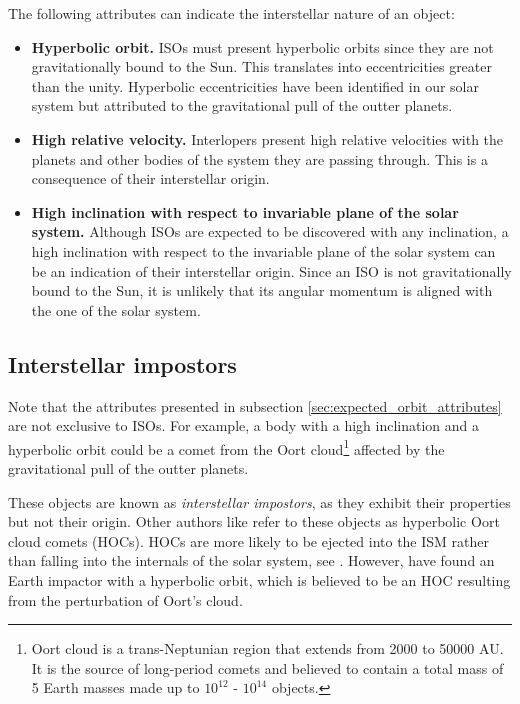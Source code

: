 The following attributes can indicate the interstellar nature of an object:

\begin{itemize}
  \item \textbf{Hyperbolic orbit.} ISOs must present hyperbolic orbits since
        they are not gravitationally bound to the Sun. This translates into
        eccentricities greater than the unity. Hyperbolic eccentricities have
        been identified in our solar system but attributed to the gravitational
        pull of the outter planets.
  \item \textbf{High relative velocity.} Interlopers present high relative
        velocities with the planets and other bodies of the system they are
        passing through. This is a consequence of their interstellar origin.
  \item \textbf{High inclination with respect to invariable plane of the solar
          system.} Although ISOs are expected to be discovered with any
        inclination, a high inclination with respect to the invariable plane of
        the solar system can be an indication of their interstellar origin.
        Since an ISO is not gravitationally bound to the Sun, it is unlikely
        that its angular momentum is aligned with the one of the solar system.
\end{itemize}

\subsection{Interstellar impostors}

Note that the attributes presented in subsection
\ref{sec:expected_orbit_attributes} are not exclusive to ISOs. For example, a
body with a high inclination and a hyperbolic orbit could be a comet from the
Oort cloud\footnote{ Oort cloud is a trans-Neptunian region that extends from
  2000 to 50000 AU. It is the source of long-period comets and believed to contain
  a total mass of 5 Earth masses made up to $10^{12}$ - $10^{14}$ objects. }
affected by the gravitational pull of the outter planets.

These objects are known as \textit{interstellar impostors}, as they exhibit
their properties but not their origin. Other authors like \cite{higuchi2020}
refer to these objects as hyperbolic Oort cloud comets (HOCs). HOCs are more
likely to be ejected into the ISM rather than falling into the internals of the
solar system, see \cite{francis2005}. However, \cite{eloy2024} have found an
Earth impactor with a hyperbolic orbit, which is believed to be an HOC resulting
from the perturbation of Oort's cloud.
